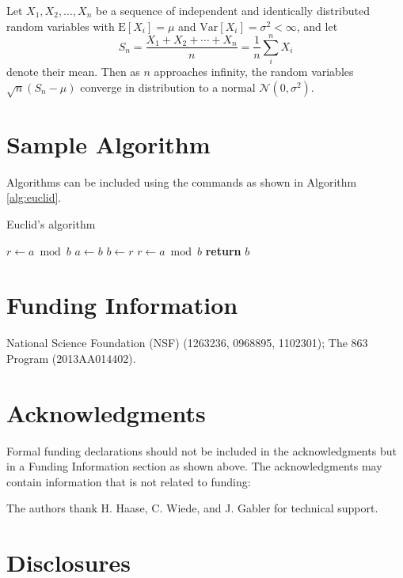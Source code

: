 \documentclass[9pt,twocolumn,twoside]{optica}
\begin{document}
Let $X_1, X_2, \ldots, X_n$ be a sequence of independent and identically distributed random variables with $\text{E}[X_i] = \mu$ and $\text{Var}[X_i] = \sigma^2 < \infty$, and let
\begin{equation}
S_n = \frac{X_1 + X_2 + \cdots + X_n}{n}
      = \frac{1}{n}\sum_{i}^{n} X_i
\label{eq:refname1}
\end{equation}
denote their mean. Then as $n$ approaches infinity, the random variables $\sqrt{n}(S_n - \mu)$ converge in distribution to a normal $\mathcal{N}(0, \sigma^2)$.

\section{Sample Algorithm}

Algorithms can be included using the commands as shown in Algorithm \ref{alg:euclid}.

\begin{algorithm}
\caption{Euclid’s algorithm}\label{alg:euclid}
\begin{algorithmic}[1]
\State $r\gets a\bmod b$
\State $a\gets b$
\State $b\gets r$
\State $r\gets a\bmod b$
\EndWhile\label{euclidendwhile}
\State \textbf{return} $b$
\EndProcedure
\end{algorithmic}
\end{algorithm}

\section*{Funding Information}
National Science Foundation (NSF) (1263236, 0968895, 1102301); The 863 Program (2013AA014402).

\section*{Acknowledgments}

Formal funding declarations should not be included in the acknowledgments but in a Funding Information section as shown above. The acknowledgments may contain information that is not related to funding:

The authors thank H. Haase, C. Wiede, and J. Gabler for technical support.

\section*{Disclosures}
\end{document}

